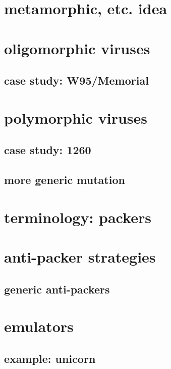 \section{metamorphic, etc. idea}


\section{oligomorphic viruses}


\subsection{case study: W95/Memorial}


\section{polymorphic viruses}


\subsection{case study: 1260}


\subsection{more generic mutation}


\section{terminology: packers}


\section{anti-packer strategies} %
\subsection{generic anti-packers}



\section{emulators}
\subsection{example: unicorn}



